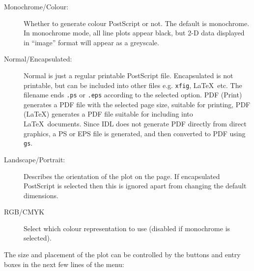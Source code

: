 \documentclass[11pt,twoside,english]{article}
\begin{document}
 \begin{description}
 \item [Monochrome/Colour:]Whether to generate colour PostScript or
   not.  The default is monochrome. In monochrome mode, all line plots
   appear black, but 2-D data displayed in {}``image'' format will
   appear as a greyscale.
 \item [Normal/Encapsulated:]Normal is just a regular printable
   PostScript file. Encapsulated is not printable, but can be included
   into other files e.g. \texttt{xfig}, \LaTeX\ etc. The filename ends
   \texttt{.ps} or \texttt{.eps} according to the selected option. PDF
   (Print) generates a PDF file with the selected page size, suitable
   for printing, PDF (LaTeX) generates a PDF file suitable for
   including into \LaTeX\ documents. Since IDL does not generate PDF
   directly from direct graphics, a PS or EPS file is generated, and
   then converted to PDF using \texttt{gs}.
 \item [Landscape/Portrait:]Describes the orientation of the plot on
   the page. If encapsulated PostScript is selected then this is
   ignored apart from changing the default dimensions.
 \item[RGB/CMYK] Select which colour representation to use (disabled if
   monochrome is selected).
 \end{description}
 The size and placement of the plot can be controlled by the buttons
 and entry boxes in the next few lines of the menu:
\end{document}
